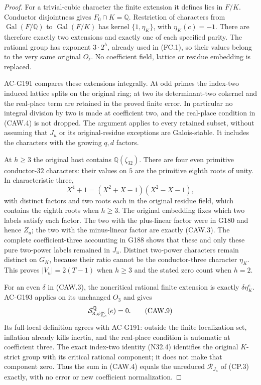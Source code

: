 \begin{proof}
For a trivial-cubic character the finite extension it defines
lies in $F/K$.  Conductor disjointness gives $F_0\cap K=\mathbb Q$.
Restriction of characters from $\operatorname{Gal}(F/\mathbb Q)$
to $\operatorname{Gal}(F/K)$ has kernel $\{1,\eta_K\}$,
with $\eta_K(c)=-1$.
There are therefore exactly two extensions and exactly one
of each specified parity.  The rational group has exponent
$3\cdot2^h$, already used in (FC.1), so their values belong
to the very same original $O_\ell$.
No coefficient field, lattice or residue embedding is replaced.

AC-G191 compares these extensions integrally.  At odd primes
the index-two induced lattice splits on the original ring;
at two its determinant-two cokernel and the real-place term
are retained in the proved finite error.
In particular no integral division by two is made at coefficient
two, and the real-place condition in (CAW.4) is not dropped.
The argument applies to every retained subset, without assuming
that $J_u$ or its original-residue exceptions are Galois-stable.
It includes the characters with the growing $q,d$ factors.

At $h\geq3$ the original host contains $\mathbb Q(\zeta_{32})$.
There are four even primitive conductor-$32$ characters:
their values on $5$ are the primitive eighth roots of unity.
In characteristic three,
\[
 X^4+1=(X^2+X-1)(X^2-X-1),
 \tag{CAW.8}
\]
with distinct factors and two roots each in the original residue
field, which contains the eighth roots when $h\geq3$.
The original embedding fixes which two labels satisfy each factor.
The two with the plus-linear factor were in G180 and hence $Z_u$;
the two with the minus-linear factor are exactly (CAW.3).
The complete coefficient-three accounting in G188 shows that
these and only these pure two-power labels remained in $J_u$.
Distinct two-power characters remain distinct on $G_K$, because
their ratio cannot be the conductor-three character $\eta_K$.
This proves $|V_u|=2(T-1)$ when $h\geq3$ and the stated zero
count when $h=2$.

For an even $\delta$ in (CAW.3), the noncritical rational finite
extension is exactly $\delta\eta_K^e$.
AC-G193 applies on its unchanged $O_3$ and gives
\[
       \mathcal S^{\mathbb Q}_{3,\psi_{\delta,e}^{\rm nc}}(e)=0.
 \tag{CAW.9}
\]
Its full-local definition agrees with AC-G191: outside the finite
localization set, inflation already kills inertia, and the
real-place condition is automatic at coefficient three.
The exact index-two identity (N32.4) identifies the original
$K$-strict group with its critical rational component; it does
not make that component zero.
Thus the sum in (CAW.4) equals the unreduced $\mathcal R_{J_u}$
of (CP.3) exactly, with no error or new coefficient normalization.


\end{proof}
